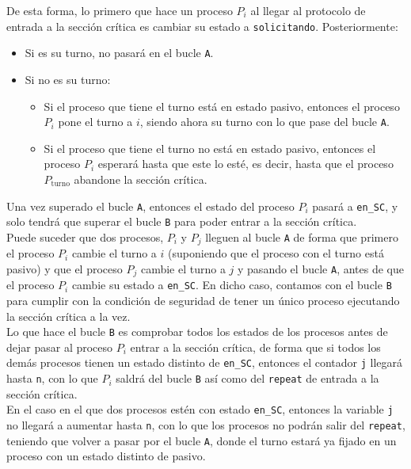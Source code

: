 De esta forma, lo primero que hace un proceso $P_i$ al llegar al protocolo de entrada a la sección crítica es cambiar su estado a \verb|solicitando|. Posteriormente:
\begin{itemize}
    \item Si es su turno, no pasará en el bucle \verb|A|.
    \item Si no es su turno:
        \begin{itemize}
            \item Si el proceso que tiene el turno está en estado pasivo, entonces el proceso $P_i$ pone el turno a $i$, siendo ahora su turno con lo que pase del bucle \verb|A|.
            \item Si el proceso que tiene el turno no está en estado pasivo, entonces el proceso $P_i$ esperará hasta que este lo esté, es decir, hasta que el proceso $P_{\text{turno}}$ abandone la sección crítica.
        \end{itemize}
\end{itemize}
Una vez superado el bucle \verb|A|, entonces el estado del proceso $P_i$ pasará a \verb|en_SC|, y solo tendrá que superar el bucle \verb|B| para poder entrar a la sección crítica.\\

Puede suceder que dos procesos, $P_i$ y $P_j$ lleguen al bucle \verb|A| de forma que primero el proceso $P_i$ cambie el turno a $i$ (suponiendo que el proceso con el turno está pasivo) y que el proceso $P_j$ cambie el turno a $j$ y pasando el bucle \verb|A|, antes de que el proceso $P_i$ cambie su estado a \verb|en_SC|. En dicho caso, contamos con el bucle \verb|B| para cumplir con la condición de seguridad de tener un único proceso ejecutando la sección crítica a la vez.\\

Lo que hace el bucle \verb|B| es comprobar todos los estados de los procesos antes de dejar pasar al proceso $P_i$ entrar a la sección crítica, de forma que si todos los demás procesos tienen un estado distinto de \verb|en_SC|, entonces el contador \verb|j| llegará hasta \verb|n|, con lo que $P_i$ saldrá del bucle \verb|B| así como del \verb|repeat| de entrada a la sección crítica.\\

En el caso en el que dos procesos estén con estado \verb|en_SC|, entonces la variable \verb|j| no llegará a aumentar hasta \verb|n|, con lo que los procesos no podrán salir del \verb|repeat|, teniendo que volver a pasar por el bucle \verb|A|, donde el turno estará ya fijado en un proceso con un estado distinto de pasivo.

